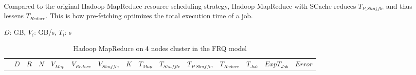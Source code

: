 {%


Compared to the original Hadoop MapReduce resource scheduling strategy, Hadoop MapReduce with SCache reduces \(T_{P\_Shuffle}\) and thus lessens \(T_{Reduce}\). This is how pre-fetching optimizes the total execution time of a job.


\begin{table}[!t]
\renewcommand{\arraystretch}{1.3}
\caption{\color{blue}Hadoop MapReduce on 4 nodes cluster in the FRQ model}
\label{table1}
\centering
\(D\): GB, \(V_{i}\): GB/s, \(T_{i}\): s
\begin{tabular}{|c||c|c|c|c|c|c|c||c|c|c|c|c|c|c|}
\hline
 &
\(D\) &	
\(R\) &	
\(N\) &	
\(V_{Map}\) &	
\(V_{Reduce}\) &	
\(V_{Shuffle}\) &	
\(K\) &	
\(T_{Map}\) &	
\(T_{Shuffle}\) &	
\(T_{P\_Shuffle}\) &
\(T_{Reduce}\) & 
\(T_{Job}\) & 
\(Exp T_{Job}\) &
\(Error\)\\


\end{tabular}
\end{table}}
